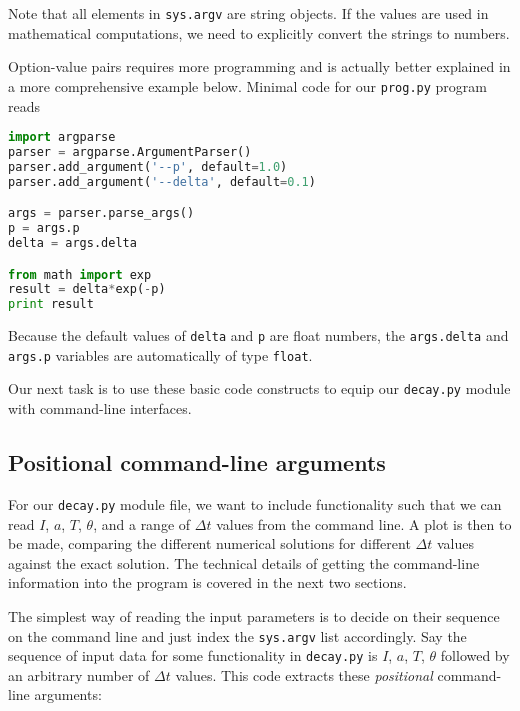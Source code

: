 \documentclass[graybox,sectrefs,envcountresetchap,open=right,final]{svmonodo}
\newenvironment{warning_mdfboxadmon}[1][]{
\begin{warning_mdfboxmdframed}[frametitle=#1]
}
{
\end{warning_mdfboxmdframed}
}
\begin{document}
\begin{warning_mdfboxadmon}
Note that all elements in \texttt{sys.argv} are string objects.
If the values are used in mathematical computations, we need
to explicitly convert the strings to numbers.
\end{warning_mdfboxadmon}



Option-value pairs requires more programming and is actually
better explained in a more comprehensive example below.
Minimal code for our \texttt{prog.py} program reads

\begin{lstlisting}[language=Python,style=blue1bar_bluegreen]
import argparse
parser = argparse.ArgumentParser()
parser.add_argument('--p', default=1.0)
parser.add_argument('--delta', default=0.1)

args = parser.parse_args()
p = args.p
delta = args.delta

from math import exp
result = delta*exp(-p)
print result
\end{lstlisting}
Because the default values of \texttt{delta} and \texttt{p} are float numbers,
the \texttt{args.delta} and \texttt{args.p} variables are automatically of type \texttt{float}.

Our next task is to use these basic code constructs to equip our
\texttt{decay.py} module with command-line interfaces.

\subsection{Positional command-line arguments}
\label{softeng1:basic:UI:pos_cml}


For our \texttt{decay.py} module file, we want to include functionality such
that we can read $I$, $a$, $T$, $\theta$, and a range of $\Delta t$
values from the command line.  A plot is then to be made, comparing
the different numerical solutions for different $\Delta t$ values
against the exact solution. The technical details of getting the
command-line information into the program is covered in the next
two sections.

The simplest way of reading the input parameters is to
decide on their sequence on the command line and just index
the \texttt{sys.argv} list accordingly.
Say the sequence of input data for some functionality in
\texttt{decay.py} is $I$, $a$, $T$, $\theta$ followed by an
arbitrary number of $\Delta t$ values. This code extracts
these \emph{positional} command-line arguments:
\end{document}
